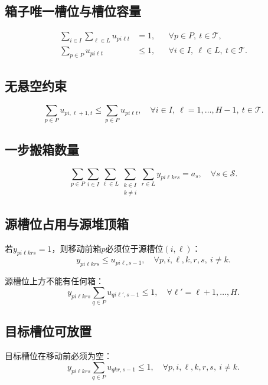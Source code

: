 \documentclass[11pt,a4paper]{ctexart}
\begin{document}
\subsection{箱子唯一槽位与槽位容量}
\begin{align}
\sum_{i\in I}\sum_{\ell\in L}u_{pi\ell t} &= 1,
&& \forall p\in P,\ t\in\mathcal{T},\\
\sum_{p\in P}u_{pi\ell t} &\le 1,
&& \forall i\in I,\ \ell\in L,\ t\in\mathcal{T}.
\end{align}

\subsection{无悬空约束}
\begin{equation}
\sum_{p\in P}u_{pi,\ell+1,t}
\le
\sum_{p\in P}u_{pi\ell t},
\quad \forall i\in I,\ \ell=1,\ldots,H-1,\ t\in\mathcal{T}.
\end{equation}

\subsection{一步搬箱数量}
\begin{equation}
\sum_{p\in P}
\sum_{i\in I}\sum_{\ell\in L}
\sum_{\substack{k\in I\\k\ne i}}\sum_{r\in L}
y_{pi\ell krs}
=a_s,\quad \forall s\in\mathcal{S}.
\end{equation}

\subsection{源槽位占用与源堆顶箱}
若$y_{pi\ell krs}=1$，则移动前箱$p$必须位于源槽位$(i,\ell)$：
\begin{equation}
y_{pi\ell krs}\le u_{pi\ell,s-1},
\quad \forall p,i,\ell,k,r,s,\ i\ne k.
\end{equation}

源槽位上方不能有任何箱：
\begin{equation}
y_{pi\ell krs}
\sum_{q\in P}u_{qi\ell',s-1}
\le 1,
\quad
\forall \ell'=\ell+1,\ldots,H.
\end{equation}

\subsection{目标槽位可放置}
目标槽位在移动前必须为空：
\begin{equation}
y_{pi\ell krs}
\sum_{q\in P}u_{qkr,s-1}
\le 1,
\quad \forall p,i,\ell,k,r,s,\ i\ne k.
\end{equation}
\end{document}
